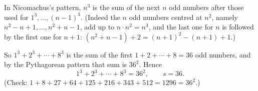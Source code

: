 In Nicomachus's pattern, $n^3$ is the sum of the next $n$ odd numbers after those used for $1^3,\dots,(n-1)^3$. (Indeed the $n$ odd numbers centred at $n^2$, namely $n^2-n+1,\dots,n^2+n-1$, add up to $n\cdot n^2=n^3$, and the last one for $n$ is followed by the first one for $n+1$: $(n^2+n-1)+2=(n+1)^2-(n+1)+1$.)

So $1^3+2^3+\cdots+8^3$ is the sum of the first $1+2+\cdots+8=36$ odd numbers, and by the Pythagorean pattern that sum is $36^2$. Hence
\[1^3+2^3+\cdots+8^3=36^2,\qquad s=\boxed{36}.\]
(Check: $1+8+27+64+125+216+343+512=1296=36^2$.)
